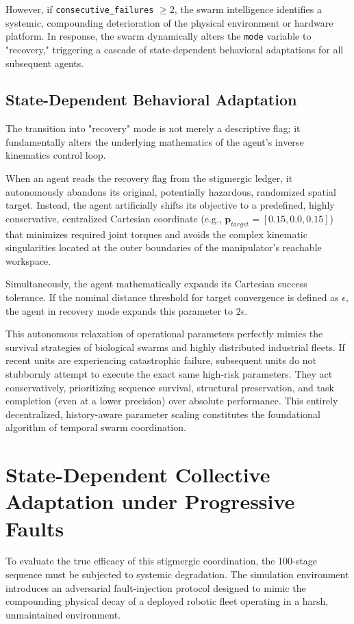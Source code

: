 \documentclass[12pt,a4paper,oneside]{report}
\begin{document}
However, if \texttt{consecutive\_failures} $\geq 2$, the swarm intelligence identifies a systemic, compounding deterioration of the physical environment or hardware platform. In response, the swarm dynamically alters the \texttt{mode} variable to "recovery," triggering a cascade of state-dependent behavioral adaptations for all subsequent agents.

\subsection{State-Dependent Behavioral Adaptation}

The transition into "recovery" mode is not merely a descriptive flag; it fundamentally alters the underlying mathematics of the agent's inverse kinematics control loop. 

When an agent reads the recovery flag from the stigmergic ledger, it autonomously abandons its original, potentially hazardous, randomized spatial target. Instead, the agent artificially shifts its objective to a predefined, highly conservative, centralized Cartesian coordinate (e.g., $\mathbf{p}_{target} = [0.15, 0.0, 0.15]$) that minimizes required joint torques and avoids the complex kinematic singularities located at the outer boundaries of the manipulator's reachable workspace.

Simultaneously, the agent mathematically expands its Cartesian success tolerance. If the nominal distance threshold for target convergence is defined as $\epsilon$, the agent in recovery mode expands this parameter to $2\epsilon$. 

This autonomous relaxation of operational parameters perfectly mimics the survival strategies of biological swarms and highly distributed industrial fleets. If recent units are experiencing catastrophic failure, subsequent units do not stubbornly attempt to execute the exact same high-risk parameters. They act conservatively, prioritizing sequence survival, structural preservation, and task completion (even at a lower precision) over absolute performance. This entirely decentralized, history-aware parameter scaling constitutes the foundational algorithm of temporal swarm coordination.

\section{State-Dependent Collective Adaptation under Progressive Faults}

To evaluate the true efficacy of this stigmergic coordination, the 100-stage sequence must be subjected to systemic degradation. The simulation environment introduces an adversarial fault-injection protocol designed to mimic the compounding physical decay of a deployed robotic fleet operating in a harsh, unmaintained environment.
\end{document}

